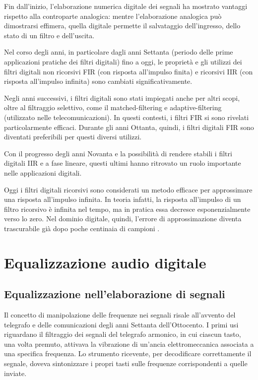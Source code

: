 \documentclass[12pt]{report}
\begin{document}
Fin dall'inizio, l'elaborazione numerica digitale dei segnali ha mostrato vantaggi rispetto alla controparte analogica: mentre l’elaborazione analogica può dimostrarsi effimera, quella digitale permette il salvataggio dell'ingresso, dello stato di un filtro e dell'uscita.

Nel corso degli anni, in particolare dagli anni Settanta (periodo delle prime applicazioni pratiche dei filtri digitali) fino a oggi, le proprietà e gli utilizzi dei filtri digitali non ricorsivi FIR (con risposta all’impulso finita) e ricorsivi IIR (con risposta all’impulso infinita) sono cambiati significativamente.

Negli anni successivi, i filtri digitali sono stati impiegati anche per altri scopi, oltre al filtraggio selettivo, come il matched-filtering e adaptive-filtering (utilizzato nelle telecomunicazioni). In questi contesti, i filtri FIR si sono rivelati particolarmente efficaci. Durante gli anni Ottanta, quindi, i filtri digitali FIR sono diventati preferibili per questi diversi utilizzi.

Con il progresso degli anni Novanta e la possibilità di rendere stabili i filtri digitali IIR e a fase lineare, questi ultimi hanno ritrovato un ruolo importante nelle applicazioni digitali.

Oggi i filtri digitali ricorsivi sono considerati un metodo efficace per approssimare una risposta all’impulso infinita. In teoria infatti, la risposta all’impulso di un filtro ricorsivo è infinita nel tempo, ma in pratica essa decresce esponenzialmente verso lo zero. Nel dominio digitale, quindi, l’errore di approssimazione diventa trascurabile già dopo poche centinaia di campioni \parencite{rader2006rise}.

\section{Equalizzazione audio digitale}
\subsection{Equalizzazione nell'elaborazione di segnali}
Il concetto di manipolazione delle frequenze nei segnali risale all’avvento del telegrafo e delle comunicazioni degli anni Settanta dell'Ottocento. I primi usi riguardano il filtraggio dei segnali del telegrafo armonico, in cui ciascun tasto, una volta premuto, attivava la vibrazione di un’ancia elettromeccanica associata a una specifica frequenza. Lo strumento ricevente, per decodificare correttamente il segnale, doveva sintonizzare i propri tasti sulle frequenze corrispondenti a quelle inviate.
\end{document}
